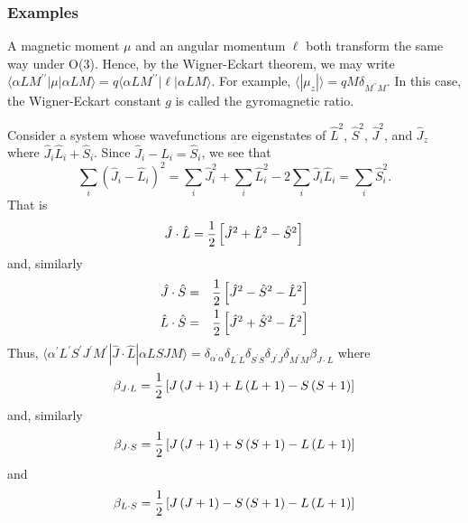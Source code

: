 \subsubsection{Examples}

A magnetic moment $\mu$ and an angular momentum $\ell$ both transform 
the same way under O(3).  Hence, by the Wigner-Eckart theorem, we may 
write $\langle \alpha LM^{\prime \prime} | \mu | \alpha LM \rangle = q 
\langle \alpha LM^{\prime \prime} | \ell | \alpha LM \rangle$.  For 
example, $\langle | \mu_z | \rangle = qM \delta_{M^{\prime 
\prime}M}$.  In this case, the Wigner-Eckart constant $g$ is called 
the gyromagnetic ratio.

Consider a system whose wavefunctions are eigenstates of 
${\hat{L}}^2$, ${\hat{S}}^2$, ${\hat{J}}^2$, and ${\hat{J}}_z$ where
${\hat{J}}_i{\hat{L}}_i + {\hat{S}}_i$.  Since ${\hat{J}}_i - 
{\hat{L}}_i = {\hat{S}}_i$, we see that
\begin{equation}
\sum_{i} \left( {\hat{J}}_i - {\hat{L}}_i \right)^2 = \sum_{i} 
{\hat{J}}_i^2 + \sum_{i} {\hat{L}}_i^2 - 2 \sum_i 
{\hat{J}}_i {\hat{L}}_i = \sum_i {\hat{S}}_i^2.
\end{equation}
That is
\begin{equation}
{\hat{J}} \cdot {\hat{L}} = {1 \over 2} \left[ {\hat{J}}^2 + 
{\hat{L}}^2 - {\hat{S}}^2 \right]
\end{equation}
and, similarly
\begin{eqnarray}
{\hat{J}} \cdot {\hat{S}} &=& {1 \over 2} \left[ {\hat{J}}^2 -
{\hat{S}}^2 - {\hat{L}}^2 \right]\cr
{\hat{L}} \cdot {\hat{S}} &=& {1 \over 2} \left[ {\hat{J}}^2 + 
{\hat{S}}^2 - {\hat{L}}^2 \right]
\end{eqnarray}
Thus, $\langle \alpha^{\prime} L^{\prime} S^{\prime} J^{\prime} 
M^{\prime} | {\hat{J}} \cdot {\hat{L}} | \alpha LSJM \rangle = 
\delta_{\alpha^{\prime}\alpha} \delta_{L^{\prime}L} 
\delta_{S^{\prime}S} \delta_{J^{\prime}J} \delta_{M^{\prime}M} 
\beta_{J \cdot L}$
where
\begin{equation}
\beta_{J \cdot L} = {1 \over 2} \left[ J \left( J+1 \right) + L 
\left( L+1 \right) - S \left( S+1 \right) \right]
\end{equation}
and, similarly
\begin{equation}
\beta_{J \cdot S} = {1 \over 2} \left[ J \left( J+1 \right) + S 
\left( S+1 \right) - L \left( L+1 \right) \right]
\end{equation}
and
\begin{equation}
\beta_{L \cdot S} = {1 \over 2} \left[ J \left( J+1 \right) - S 
\left( S+1 \right) - L \left( L+1 \right) \right]
\end{equation}
